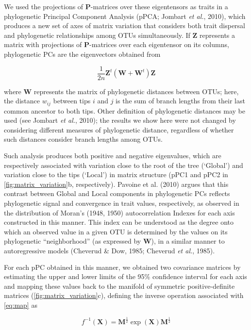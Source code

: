 \documentclass[12pt,twoside]{report}
\begin{document}
We used the projections of $\mathbf{P}$-matrices over these eigentensors
as traits in a phylogenetic Principal Component Analysis (pPCA; Jombart
\emph{et al.}, 2010), which produces a new set of axes of matrix
variation that considers both trait dispersal and phylogenetic
relationships among OTUs simultaneously. If $\mathbf{Z}$ represents a
matrix with projections of $\mathbf{P}$-matrices over each eigentensor
on its columns, phylogenetic PCs are the eigenvectors obtained from

\begin{equation}
\frac{1}{2n} \mathbf{Z}^t(\mathbf{W} + \mathbf{W}^t) \mathbf{Z}
\end{equation}

where $\mathbf{W}$ represents the matrix of phylogenetic distances
between OTUs; here, the distance $w_{ij}$ between tips $i$ and $j$ is
the sum of branch lengths from their last common ancestor to both tips.
Other definition of phylogenetic distances may be used (see Jombart
\emph{et al.}, 2010); the results we show here were not changed by
considering different measures of phylogenetic distance, regardless of
whether such distances consider branch lengths among OTUs.

Such analysis produces both positive and negative eigenvalues, which are
respectively associated with variation close to the root of the tree
(`Global') and variation close to the tips (`Local') in matrix structure
(pPC1 and pPC2 in \autoref{fig:matrix_variation}b, respectively).
Pavoine et al. (2010) argues that this contrast between Global and Local
components in phylogenetic PCs reflects phylogenetic signal and
convergence in trait values, respectively, as observed in the
distribution of Moran's (1948, 1950) autocorrelation Indexes for each
axis constructed in this manner. This index can be understood as the
degree onto which an observed value in a given OTU is determined by the
values on its phylogenetic ``neighborhood'' (as expressed by
$\mathbf{W}$), in a similar manner to autoregressive models (Cheverud \&
Dow, 1985; Cheverud \emph{et al.}, 1985).

For each pPC obtained in this manner, we obtained two covariance
matrices by estimating the upper and lower limits of the 95\% confidence
interval for each axis and mapping these values back to the manifold of
symmetric positive-definite matrices (\autoref{fig:matrix_variation}c),
defining the inverse operation associated with \autoref{eq:map} as

\begin{equation}
f^{-1}(\mathbf{X}) = \mathbf{M}^{\frac{1}{2}}\exp(\mathbf{X})\mathbf{M}^{\frac{1}{2}}
\label{eq:inv}
\end{equation}
\end{document}
